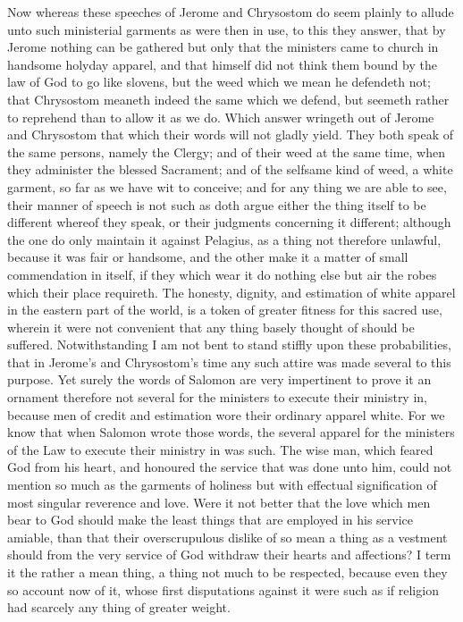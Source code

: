 Now whereas these speeches of Jerome and Chrysostom do seem plainly to allude unto such ministerial garments as were then in use, to this they answer, that by Jerome nothing can be gathered but only that the ministers came to church in handsome holyday apparel, and that himself did not think them bound by the law of God to go like slovens, but the weed which we mean he defendeth not; that Chrysostom meaneth indeed the same which we defend, but seemeth rather to reprehend than to allow it as we do. Which answer wringeth out of Jerome and Chrysostom that which their words will not gladly yield. They both speak of the same persons, namely the Clergy; and of their weed at the same time, when they administer the blessed Sacrament; and of the selfsame kind of weed, a white garment, so far as we have wit to conceive; and for any thing we are able to see, their manner of speech is not such as doth argue either the thing itself to be different whereof they speak, or their judgments  concerning it different; although the one do only maintain it against Pelagius, as a thing not therefore unlawful, because it was fair or handsome, and the other make it a matter of small commendation in itself, if they which wear it do nothing else but air the robes which their place requireth. The honesty, dignity, and estimation of white apparel in the eastern part of the world, is a token of greater fitness for this sacred use, wherein it were not convenient that any thing basely thought of should be suffered. Notwithstanding I am not bent to stand stiffly upon these probabilities, that in Jerome’s and Chrysostom’s time any such attire was made several to this purpose. Yet surely the words of Salomon are very impertinent to prove it an ornament therefore not several for the ministers to execute their ministry in, because men of credit and estimation wore their ordinary apparel white. For we know that when Salomon wrote those words, the several apparel for the ministers of the Law to execute their ministry in was such.
The wise man, which feared God from his heart, and honoured the service that was done unto him, could not mention so much as the garments of holiness but with effectual signification of most singular reverence and love. Were it not better that the love which men bear to God should make the least things that are employed in his service amiable, than that their overscrupulous dislike of so mean a thing as a vestment should from the very service of God withdraw their hearts and affections? I term it the rather a mean thing, a thing not much to be respected, because even they so account now of it, whose first disputations against it were such as if religion had scarcely any thing of greater weight.
